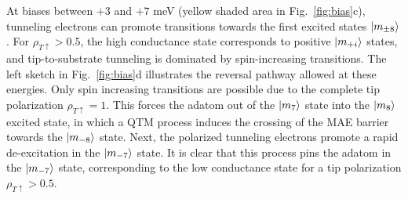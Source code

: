 \documentclass[
reprint,amsmath,amssymb,aps]{revtex4-2}
\begin{document}
At biases between $+3$ and $+7$ meV (yellow shaded area in Fig.~\ref{fig:bias}c), tunneling electrons can promote transitions towards the first excited states $\ket{m_{\pm 8}}$. For $\rho_{T \uparrow} > 0.5 $, the high conductance state corresponds to positive $\ket{m_{+i}}$ states, and tip-to-substrate tunneling is dominated by spin-increasing transitions. The left sketch in Fig.~\ref{fig:bias}d illustrates the reversal pathway allowed at these energies. Only spin increasing transitions are possible due to the complete tip polarization $\rho_{T \uparrow} = 1$. This forces the adatom out of the $\ket{m_{7}}$ state into the $\ket{m_{8}}$ excited state, in which a QTM process induces the crossing of the MAE barrier towards the $\ket{m_{-8}}$ state. Next, the polarized tunneling electrons promote a rapid de-excitation in the $\ket{m_{-7}}$ state. It is clear that this process pins the adatom in the $\ket{m_{-7}}$ state, corresponding to the low conductance state for a tip polarization $\rho_{T \uparrow} > 0.5 $. 
\end{document}
